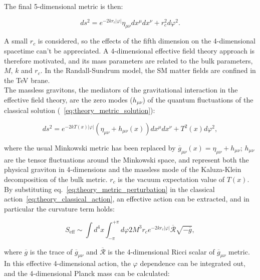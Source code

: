 \noindent The final 5-dimensional metric is then:

\begin{equation}
ds^2 = e^{-2 k r_c \left| \varphi \right|} \eta_{\mu \nu} dx^{\mu} dx^{\nu} + r_c^2 d{\varphi}^2.
\label{eq:theory_metric_solution}
\end{equation}

\noindent A small $r_c$ is considered, so the effects of the fifth dimension on the 4-dimensional spacetime can't be appreciated. A 4-dimensional effective field theory approach is therefore motivated, and its mass parameters are related to the bulk parameters, $M$, $k$ and $r_c$. In the Randall-Sundrum model, the SM matter fields are confined in the TeV brane.\\
The massless gravitons, the mediators of the gravitational interaction in the effective field theory, are the zero modes ($h_{\mu \nu}$) of the quantum fluctuations of the classical solution (~\ref{eq:theory_metric_solution}):

\begin{equation}
ds^2 = e^{-2 k T(x) \left| \varphi \right|} \left( \eta_{\mu \nu} + h_{\mu \nu}(x) \right) dx^{\mu} dx^{\nu} + T^2(x) d{\varphi}^2,
\label{eq:theory_metric_perturbation}
\end{equation}

\noindent where the usual Minkowski metric has been replaced by $\overline{g}_{\mu \nu} (x) = \eta_{\mu \nu} + h_{\mu \nu}$; $h_{\mu \nu}$ are the tensor fluctuations around the Minkowski space, and represent both the physical graviton in 4-dimensions and the massless mode of the Kaluza-Klein decomposition of the bulk metric. $r_c$ is the vacuum expectation value of $T(x)$.\\
By substituting eq.~\ref{eq:theory_metric_perturbation} in the classical action~\ref{eq:theory_classical_action}, an effective action can be extracted, and in particular the curvature term holds:

\begin{equation}
S_{\text{eff}} \sim \int d^4 x \int_{-\pi}^{+\pi} d \varphi 2 M^3 r_c e^{-2 k r_c \left| \varphi \right|} \overline{\mathcal{R}} \sqrt{-\overline{g}},
\label{eq:theory_effective_action}
\end{equation}

\noindent where $\overline{g}$ is the trace of $\overline{g}_{\mu \nu}$ and $\overline{\mathcal{R}}$ is the 4-dimensional Ricci scalar of $\overline{g}_{\mu \nu}$ metric. In this effective 4-dimensional action, the $\varphi$ dependence can be integrated out, and the 4-dimensional Planck mass can be calculated:

